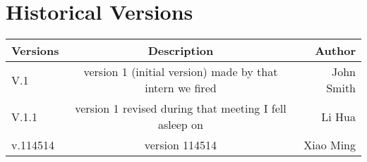 \documentclass{Atomic}
\begin{document}
\maketitle
\insertCover%
\frontmatter
\chapter{Historical Versions}

\begin{center}
\begin{tabular}{| l | c | r |}
    \hline
    Versions & Description & Author\\
    \hline
    V.1 & version 1 (initial version) made by that intern we fired & John Smith\\
    V.1.1 & version 1 revised during that meeting I fell asleep on & Li  Hua\\
    v.114514 & version 114514 & Xiao Ming\\
    \hline
\end{tabular}
\end{center}
\newpage

\tableofcontents
\mainmatter


\end{document}
